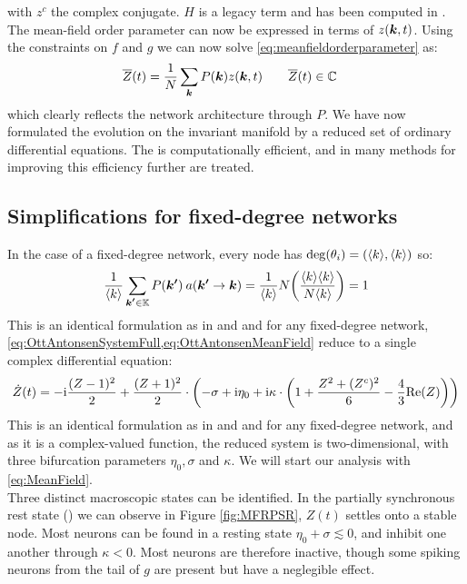 with $z^c$ the complex conjugate. $H$ is a legacy term and has been computed in \cite{Martens2020}.
The mean-field order parameter can now be expressed in terms of $z({\boldsymbol{k}},t)$. Using the constraints on $f$ and $g$ we can now solve \eqref{eq:meanfieldorderparameter} as:
\begin{align}
\overline{Z}(t) &= \frac{1}{N} \sum_{{\boldsymbol{k}}} P({\boldsymbol{k}}) z({\boldsymbol{k}}, t) \qquad \overline{Z}(t) \in {\mathbb{C}} \label{eq:OttAntonsenMeanField}
\end{align}
which clearly reflects the network architecture through $P$. We have now formulated the evolution on the invariant manifold by a reduced set of ordinary differential equations. The \MFR is computationally efficient, and in \cite{OttAntonsen2017} many methods for improving this efficiency further are treated.


\subsection{Simplifications for fixed-degree networks}
In the case of a fixed-degree network, every node has $\deg (\theta_i) = ({\langle k\rangle}, {\langle k\rangle})$ so:
\begin{align*}
    \frac{1}{\kmean} \sum_{\kacc \in \K} P\left(\kacc\right) \: a\left(\kacc \rightarrow \k\right) = \frac{1}{\kmean} N \left( \frac{\kmean \kmean}{N \kmean} \right) = 1
\end{align*}
This is an identical formulation as in \cite{Luke2013} and \cite{Martens2020} and for any fixed-degree network, \cref{eq:OttAntonsenSystemFull,eq:OttAntonsenMeanField} reduce to a single complex differential equation:
\begin{align}
\dot{Z}(t)= -\ic \frac{(Z-1)^2}{2}+\frac{(Z+1)^2}{2} \cdot \left(-\sigma+ \ic\eta_{0}
+ \ic \kappa \cdot \left(1+\frac{Z^{2} + (Z^c)^{2} }{6} - \frac{4}{3} \Re(Z)\right)\right) \label{eq:MeanField}
\end{align}
This is an identical formulation as in \cite{Luke2013} and \cite{Martens2020} and for any fixed-degree network, and as it is a complex-valued function, the reduced system is two-dimensional, with three bifurcation parameters $\eta_0, \sigma$ and $\kappa$. We will start our analysis with \eqref{eq:MeanField}.\\

Three distinct macroscopic states can be identified. In the partially synchronous rest state (\PSR) we can observe in Figure \ref{fig:MFRPSR}, $Z(t)$ settles onto a stable node. Most neurons can be found in a resting state $\eta_0 + \sigma \lesssim 0$, and inhibit one another through $\kappa < 0$. Most neurons are therefore inactive, though some spiking neurons from the tail of $g$ are present but have a neglegible effect. \\

